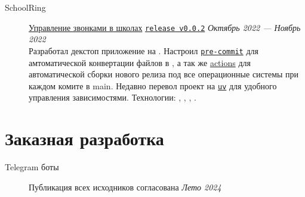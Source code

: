 \documentclass[margin,line]{resume}
\begin{document}
\begin{resume}
\begin{description}
      \vspace{3mm}

    \item[SchoolRing]\small{\href{https://github.com/alchemmist/school-ring}{Управление
        звонками в школах}
        \begingroup
        \hypersetup{urlcolor=blue!30}
        \href{https://github.com/}{\texttt{release v0.0.2}}
        \endgroup
        \hfill
      \textsl{Октябрь 2022 — Ноябрь 2022\vspace{1mm}}}\\
      Разработал декстоп приложение на . Настроил
      \href{https://github.com}{\texttt{pre-commit}} для
      амтоматической конвертации  файлов в
      , а так же \href{https://github.com}{actions}
      для автоматической сборки нового релиза под все
      операционные системы при каждом комите в main. Недавно перевол
      проект на \href{https://astral.sh/blog/uv}{\texttt{uv}} для
      удобного управления зависимостями.
      Технологии:
      , ,
      , .

  \end{description}

  \section{\mysidestyle Заказная разработка}\vspace{2mm}

  \begin{description}
    \item[Telegram боты]\small{
        \begingroup
        \textcolor{gray!40}{Публикация всех исходников согласована}
        \endgroup
      }{\hfill
      \textsl{Лето 2024}}\vspace{2mm}
\end{description}
\end{resume}
\end{document}
